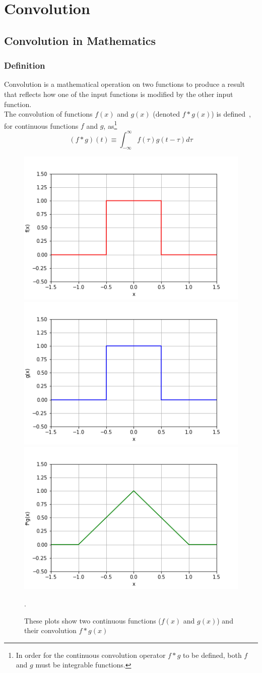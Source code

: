 \chapter[Convolution]{Convolution}
\label{ch:convolution}
\section{Convolution in Mathematics}
\label{sec:convolution:mathematics}
\subsection{Definition}
\label{sec:convolution:mathematics:definitions}
Convolution is a mathematical operation on two functions to produce a result that reflects how one of the input functions is modified by the other input function.\\
The convolution of functions $f(x)$ and $g(x)$ (denoted $f*g(x)$) is defined~\citep{Bracewell2000}, for continuous functions $f$ and $g$, as\footnote{In order for the continuous convolution operator $f * g$ to be defined, both $f$ and $g$ must be integrable functions.}
\begin{equation}
(f * g) (t)\equiv\int_{-\infty}^{\infty} f(\tau) g(t-\tau)d\tau
\end{equation}
\begin{figure}[h]
    \includegraphics[width=.32\linewidth]{graphics/convolution/convolution_continuos_f_gebs.png}
    \includegraphics[width=.32\linewidth]{graphics/convolution/convolution_continuos_g_gebs.png}
    \includegraphics[width=.32\linewidth]{graphics/convolution/convolution_continuos_fg_gebs.png}
    \caption{These plots show two continuous functions ($f(x)$ and $g(x)$) and their convolution $f*g(x)$}.
    \label{fig:continuousconvolution}
\end{figure}\FloatBarrier

